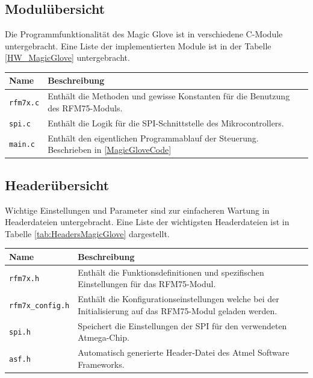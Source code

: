 \subsection*{Modulübersicht}
Die Programmfunktionalität des Magic Glove ist in verschiedene C-Module untergebracht. Eine Liste der implementierten Module ist in der Tabelle \ref{HW_MagicGlove} untergebracht.
\begin{center}
\begin{tabularx}{\textwidth}{l|X}
	Name & Beschreibung \\ \hline
	\texttt{rfm7x.c} & Enthält die Methoden und gewisse Konstanten für die Benutzung des RFM75-Moduls. \\ \hline
	\texttt{spi.c} & Enthält die Logik für die SPI-Schnittstelle des Mikrocontrollers. \\ \hline
	\texttt{main.c} & Enthält den eigentlichen Programmablauf der Steuerung. Beschrieben in \ref{MagicGloveCode} \\ 
	\hline
\end{tabularx}
	\label{tab:ModulesMagicGlove}
\end{center}
\subsection*{Headerübersicht}
Wichtige Einstellungen und Parameter sind zur einfacheren Wartung in Headerdateien untergebracht. Eine Liste der wichtigsten Headerdateien ist in Tabelle \ref{tab:HeadersMagicGlove} dargestellt.
\begin{center}
\begin{tabularx}{\textwidth}{l|X}
	Name & Beschreibung \\ \hline
	\texttt{rfm7x.h} & Enthält die Funktionsdefinitionen und spezifischen Einstellungen für das RFM75-Modul. \\ \hline
	\texttt{rfm7x{\_}config.h} & Enthält die Konfigurationseinstellungen welche bei der Initialisierung auf das RFM75-Modul geladen werden. \\ \hline
	\texttt{spi.h} & Speichert die Einstellungen der SPI für den verwendeten Atmega-Chip. \\ \hline
	\texttt{asf.h} & Automatisch generierte Header-Datei des Atmel Software Frameworks. \\
	\hline
\end{tabularx}
	\label{tab:HeadersMagicGlove}
\end{center}
